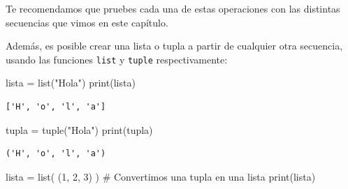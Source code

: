 \documentclass[
  letterpaper,
  DIV=11,
  numbers=noendperiod]{scrreprt}
\newenvironment{Shaded}{\begin{snugshade}}{\end{snugshade}}
\newcommand{\BuiltInTok}[1]{\textcolor[rgb]{0.00,0.23,0.31}{#1}}
\newcommand{\CommentTok}[1]{\textcolor[rgb]{0.37,0.37,0.37}{#1}}
\newcommand{\DecValTok}[1]{\textcolor[rgb]{0.68,0.00,0.00}{#1}}
\newcommand{\NormalTok}[1]{\textcolor[rgb]{0.00,0.23,0.31}{#1}}
\newcommand{\OperatorTok}[1]{\textcolor[rgb]{0.37,0.37,0.37}{#1}}
\newcommand{\StringTok}[1]{\textcolor[rgb]{0.13,0.47,0.30}{#1}}
\begin{document}
\begin{tcolorbox}[enhanced jigsaw, bottomrule=.15mm, leftrule=.75mm, opacityback=0, colback=white, toprule=.15mm, bottomtitle=1mm, opacitybacktitle=0.6, rightrule=.15mm, left=2mm, arc=.35mm, coltitle=black, title=\textcolor{quarto-callout-tip-color}{\faLightbulb}\hspace{0.5em}{Tip}, breakable, toptitle=1mm, colframe=quarto-callout-tip-color-frame, titlerule=0mm, colbacktitle=quarto-callout-tip-color!10!white]

Te recomendamos que pruebes cada una de estas operaciones con las
distintas secuencias que vimos en este capítulo.

\end{tcolorbox}

Además, es posible crear una lista o tupla a partir de cualquier otra
secuencia, usando las funciones \texttt{list} y \texttt{tuple}
respectivamente:

\begin{Shaded}
\begin{Highlighting}[]
\NormalTok{lista }\OperatorTok{=} \BuiltInTok{list}\NormalTok{(}\StringTok{"Hola"}\NormalTok{)}
\BuiltInTok{print}\NormalTok{(lista)}
\end{Highlighting}
\end{Shaded}

\begin{verbatim}
['H', 'o', 'l', 'a']
\end{verbatim}

\begin{Shaded}
\begin{Highlighting}[]
\NormalTok{tupla }\OperatorTok{=} \BuiltInTok{tuple}\NormalTok{(}\StringTok{"Hola"}\NormalTok{)}
\BuiltInTok{print}\NormalTok{(tupla)}
\end{Highlighting}
\end{Shaded}

\begin{verbatim}
('H', 'o', 'l', 'a')
\end{verbatim}

\begin{Shaded}
\begin{Highlighting}[]
\NormalTok{lista }\OperatorTok{=} \BuiltInTok{list}\NormalTok{( (}\DecValTok{1}\NormalTok{, }\DecValTok{2}\NormalTok{, }\DecValTok{3}\NormalTok{) ) }\CommentTok{\# Convertimos una tupla en una lista}
\BuiltInTok{print}\NormalTok{(lista)}
\end{Highlighting}
\end{Shaded}
\end{document}

